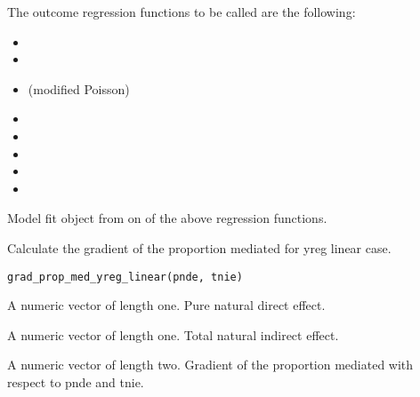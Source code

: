 \documentclass[a4paper]{book}
\begin{document}
%
\begin{Details}
The outcome regression functions to be called are the following:
\begin{itemize}

\item{}  
\item{}  
\item{}   (modified Poisson)
\item{}  
\item{}  
\item{}  
\item{}  
\item{}  

\end{itemize}

\end{Details}
%
\begin{Value}
Model fit object from on of the above regression functions.
\end{Value}
%
\begin{Description}
Calculate the gradient of the proportion mediated for yreg linear case.
\end{Description}
%
\begin{Usage}
\begin{verbatim}
grad_prop_med_yreg_linear(pnde, tnie)
\end{verbatim}
\end{Usage}
%
\begin{Arguments}
\begin{ldescription}
\item[\code{pnde}] A numeric vector of length one. Pure natural direct effect.

\item[\code{tnie}] A numeric vector of length one. Total natural indirect effect.
\end{ldescription}
\end{Arguments}
%
\begin{Value}
A numeric vector of length two. Gradient of the proportion mediated with respect to pnde and tnie.
\end{Value}
\end{document}
